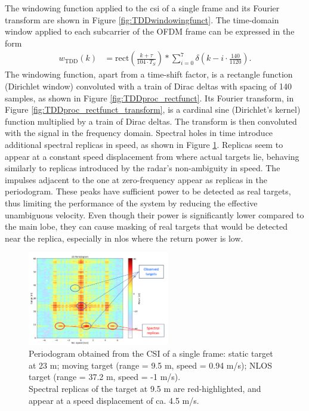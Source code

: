     The windowing function applied to the \gls{csi} of a single frame and its Fourier transform are shown in Figure \ref{fig:TDDwindowingfunct}.
    The time-domain window applied to each subcarrier of the OFDM frame can be expressed in the form
    \begin{align}
        w_{\text{TDD}}(k) &= \text{rect}\left( \frac{k + \tau}{104 \cdot T_S}\right) \ast \sum_{i=0}^7 \delta\left( k - i\cdot \frac{140}{1120} \right).
    \end{align}
    The windowing function, apart from a time-shift factor, is a rectangle function (Dirichlet window) convoluted with a train of Dirac deltas with spacing of 140 samples, as shown in Figure \ref{fig:TDDproc_rectfunct}. Its Fourier transform, in Figure \ref{fig:TDDproc_rectfunct_transform}, is a cardinal sine (Dirichlet's kernel) function multiplied by a train of Dirac deltas.
    The transform is then convoluted with the signal in the frequency domain. 
    Spectral holes in time introduce additional spectral replicas in speed, as shown in Figure \ref{fig:SpectralReplicasDLULpattern}. Replicas seem to appear at a constant speed displacement from where actual targets lie, behaving similarly to replicas introduced by the radar's non-ambiguity in speed.
    The impulses adjacent to the one at zero-frequency appear as replicas in the periodogram. These peaks have sufficient power to be detected as real targets, thus limiting the performance of the system by reducing the effective unambiguous velocity. Even though their power is significantly lower compared to the main lobe, they can cause masking of real targets that would be detected near the replica, especially in \gls{nlos} where the return power is low. 
    \begin{figure}[b!]
    	\centering
    	\includegraphics[width=0.55\textwidth]{Images/TDDprocessing/SpectralReplicasDLULpattern.png}
    	\caption{\small Periodogram obtained from the CSI of a single frame: static target at 23 m; moving target (range = 9.5 m, speed = 0.94 m/s); NLOS target (range = 37.2 m, speed = -1 m/s).\\
    		Spectral replicas of the target at 9.5 m are red-highlighted, and appear at a speed displacement of ca. 4.5 m/s.}
    	\label{fig:SpectralReplicasDLULpattern}
    \end{figure}

